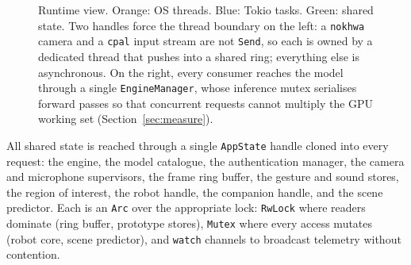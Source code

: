 \documentclass[11pt,onecolumn]{article}
\newcommand{\code}[1]{\texttt{#1}}
\begin{document}
\begin{figure}[t]
{}
\caption{Runtime view. Orange: OS threads. Blue: Tokio tasks. Green: shared state. Two
handles force the thread boundary on the left: a \code{nokhwa} camera and a \code{cpal}
input stream are not \code{Send}, so each is owned by a dedicated thread that pushes into
a shared ring; everything else is asynchronous. On the right, every consumer reaches the
model through a single \code{EngineManager}, whose inference mutex serialises forward
passes so that concurrent requests cannot multiply the GPU working set
(Section~\ref{sec:measure}).}
\label{fig:runtime}
\end{figure}

All shared state is reached through a single \code{AppState} handle cloned into every
request: the engine, the model catalogue, the authentication manager, the camera and
microphone supervisors, the frame ring buffer, the gesture and sound stores, the region
of interest, the robot handle, the companion handle, and the scene predictor. Each is an
\code{Arc} over the appropriate lock: \code{RwLock} where readers dominate (ring buffer,
prototype stores), \code{Mutex} where every access mutates (robot core, scene predictor),
and \code{watch} channels to broadcast telemetry without contention.
\end{document}
